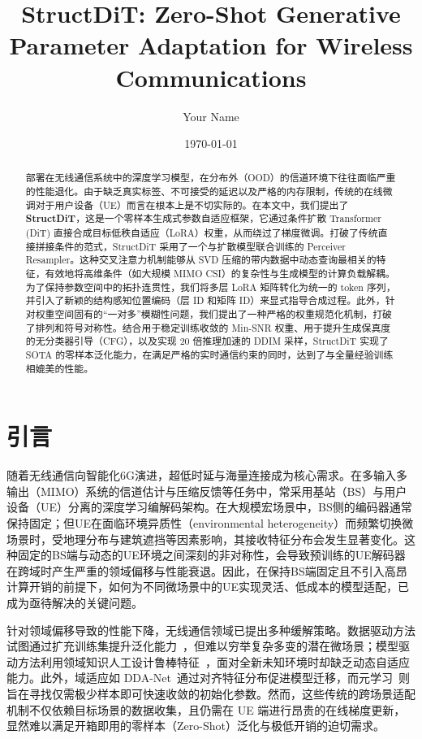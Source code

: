 \documentclass[12pt,a4paper]{article}
\begin{document}
\title{StructDiT: Zero-Shot Generative Parameter Adaptation for Wireless Communications}
\author{Your Name}
\date{\today}

\maketitle


\begin{abstract}
部署在无线通信系统中的深度学习模型，在分布外（OOD）的信道环境下往往面临严重的性能退化。由于缺乏真实标签、不可接受的延迟以及严格的内存限制，传统的在线微调对于用户设备（UE）而言在根本上是不切实际的。在本文中，我们提出了 \textbf{StructDiT}，这是一个零样本生成式参数自适应框架，它通过条件扩散 Transformer (DiT) 直接合成目标低秩自适应（LoRA）权重，从而绕过了梯度微调。打破了传统直接拼接条件的范式，StructDiT 采用了一个与扩散模型联合训练的 Perceiver Resampler。这种交叉注意力机制能够从 SVD 压缩的带内数据中动态查询最相关的特征，有效地将高维条件（如大规模 MIMO CSI）的复杂性与生成模型的计算负载解耦。为了保持参数空间中的拓扑连贯性，我们将多层 LoRA 矩阵转化为统一的 token 序列，并引入了新颖的结构感知位置编码（层 ID 和矩阵 ID）来显式指导合成过程。此外，针对权重空间固有的“一对多”模糊性问题，我们提出了一种严格的权重规范化机制，打破了排列和符号对称性。结合用于稳定训练收敛的 Min-SNR 权重、用于提升生成保真度的无分类器引导（CFG），以及实现 20 倍推理加速的 DDIM 采样，StructDiT 实现了 SOTA 的零样本泛化能力，在满足严格的实时通信约束的同时，达到了与全量经验训练相媲美的性能。
\end{abstract}


\section{引言}
\label{sec:intro}

随着无线通信向智能化6G演进，超低时延与海量连接成为核心需求。在多输入多输出（MIMO）系统的信道估计与压缩反馈等任务中，常采用基站（BS）与用户设备（UE）分离的深度学习编解码架构。在大规模宏场景中，BS侧的编码器通常保持固定；但UE在面临环境异质性（environmental heterogeneity）而频繁切换微场景时，受地理分布与建筑遮挡等因素影响，其接收特征分布会发生显著变化。这种固定的BS端与动态的UE环境之间深刻的非对称性，会导致预训练的UE解码器在跨域时产生严重的领域偏移与性能衰退。因此，在保持BS端固定且不引入高昂计算开销的前提下，如何为不同微场景中的UE实现灵活、低成本的模型适配，已成为亟待解决的关键问题。

针对领域偏移导致的性能下降，无线通信领域已提出多种缓解策略。数据驱动方法试图通过扩充训练集提升泛化能力~\cite{wen2018csinet}，但难以穷举复杂多变的潜在微场景；模型驱动方法利用领域知识人工设计鲁棒特征~\cite{he2019model}，面对全新未知环境时却缺乏动态自适应能力。此外，域适应如 DDA-Net~\cite{feng2023ddanet}通过对齐特征分布促进模型迁移，而元学习~\cite{zhao2025enhanced}则旨在寻找仅需极少样本即可快速收敛的初始化参数。然而，这些传统的跨场景适配机制不仅依赖目标场景的数据收集，且仍需在 UE 端进行昂贵的在线梯度更新，显然难以满足开箱即用的零样本（Zero-Shot）泛化与极低开销的迫切需求。
\end{document}
